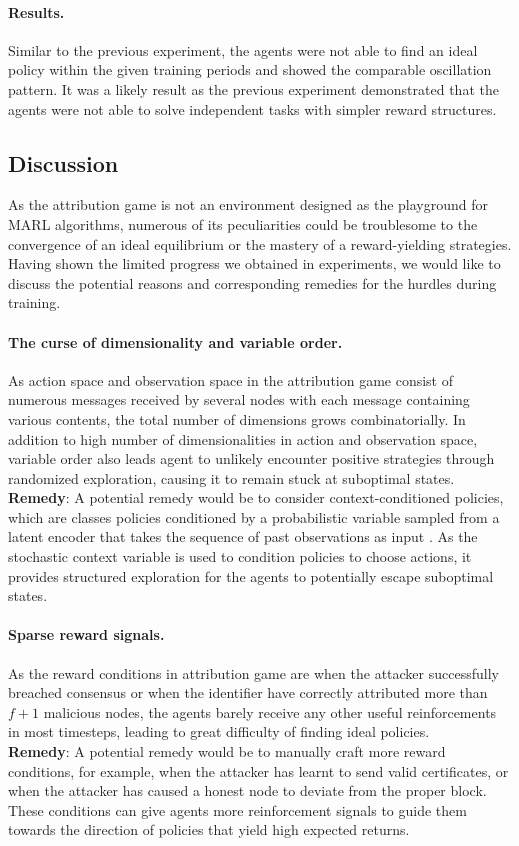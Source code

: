 \documentclass[a4paper,11pt]{article}
\begin{document}
\paragraph{Results.} Similar to the previous experiment, the agents were not able to find an ideal policy within the given training periods and showed the comparable oscillation pattern. It was a likely result as the previous experiment demonstrated that the agents were not able to solve independent tasks with simpler reward structures.

\subsection{Discussion}\label{sec:discussion}
As the attribution game is not an environment designed as the playground for MARL algorithms, numerous of its peculiarities could be troublesome to the convergence of an ideal equilibrium or the mastery of a reward-yielding strategies. Having shown the limited progress we obtained in experiments, we would like to discuss the potential reasons and corresponding remedies for the hurdles during training.
\paragraph{The curse of dimensionality and variable order.} As action space and observation space in the attribution game consist of numerous messages received by several nodes with each message containing various contents, the total number of dimensions grows combinatorially. In addition to high number of dimensionalities in action and observation space, variable order also leads agent to unlikely encounter positive strategies through randomized exploration, causing it to remain stuck at suboptimal states.\\
{\bf{Remedy}}: A potential remedy would be to consider context-conditioned policies, which are classes policies conditioned by a probabilistic variable sampled from a latent encoder that takes the sequence of past observations as input \cite{DBLP:journals/corr/abs-1903-08254} \cite{DBLP:journals/corr/abs-1802-07245}. As the stochastic context variable is used to condition policies to choose actions, it provides structured exploration for the agents to potentially escape suboptimal states.

\paragraph{Sparse reward signals.}As the reward conditions in attribution game are when the attacker successfully breached consensus or when the identifier have correctly attributed more than $f+1$ malicious nodes, the agents barely receive any other useful reinforcements in most timesteps, leading to great difficulty of finding ideal policies. \\
{\bf{Remedy}}: A potential remedy would be to manually craft more reward conditions, for example, when the attacker has learnt to send valid certificates, or when the attacker has caused a honest node to deviate from the proper block. These conditions can give agents more reinforcement signals to guide them towards the direction of policies that yield high expected returns.
\end{document}
